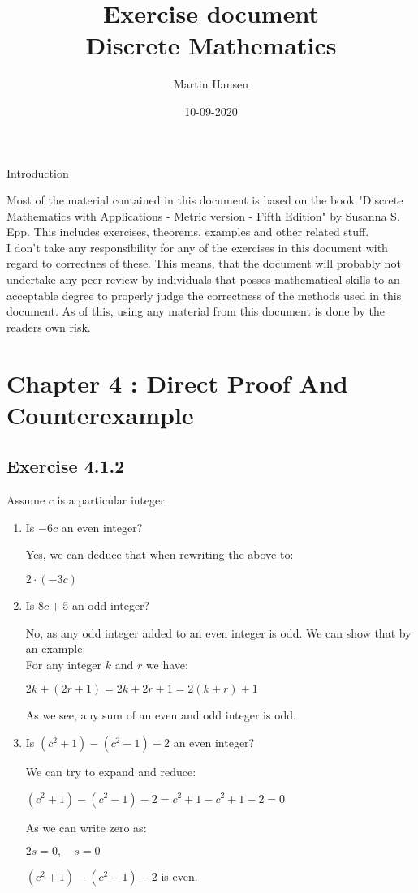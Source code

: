\documentclass{article}
\author{Martin Hansen}
\date{10-09-2020}
\title{Exercise document \\ \small Discrete Mathematics}
\newcommand{\cent}[1]{\begin{center}#1\end{center}}
\newcommand{\Exercise}[1]{\subsection{Exercise #1}}
\begin{document}
	\maketitle
	
	\pagebreak
	
	\begin{center}
		\Large Introduction
	\end{center}
	
	Most of the material contained in this document is based on the book "Discrete Mathematics with Applications - Metric version - Fifth Edition" by Susanna S. Epp. This includes exercises, theorems, examples and other related stuff.\\
	
	I don't take any responsibility for any of the exercises in this document with regard to correctnes of these. This means, that the document will probably not undertake any peer review by individuals that posses mathematical skills to an acceptable degree to properly judge the correctness of the methods used in this document. As of this, using any material from this document is done by the readers own risk.
	
	\pagebreak
	
	\section{Chapter 4 : Direct Proof And Counterexample}
	\Exercise{4.1.2}
	Assume $c$ is a particular integer.
	\begin{enumerate}[label=\textbf{\alph*.}]
		\item Is $-6c$ an even integer?
		
		Yes, we can deduce that when rewriting the above to:
		
		$2\cdot (-3c) $
		
		\item Is $8c+5$ an odd integer?
		
		No, as any odd integer added to an even integer is odd. We can show that by an example:\\
		
		For any integer $k$ and $r$ we have:
		\cent{$2k + (2r+1) = 2k + 2r + 1 = 2(k+r) + 1$}
		
		As we see, any sum of an even and odd integer is odd.
		
		\item Is $(c^2 + 1) - (c^2 - 1) - 2$ an even integer?
		
		We can try to expand and reduce:
		
		\cent{$(c^2 + 1) - (c^2 - 1) - 2 = c^2 + 1 - c^2 + 1 - 2 = 0$}
		
		As we can write zero as:
		
		\cent{$2s = 0, \quad s = 0$}
		
		$(c^2 + 1) - (c^2 - 1) - 2$ is even.
	\end{enumerate}
	
\end{document}
